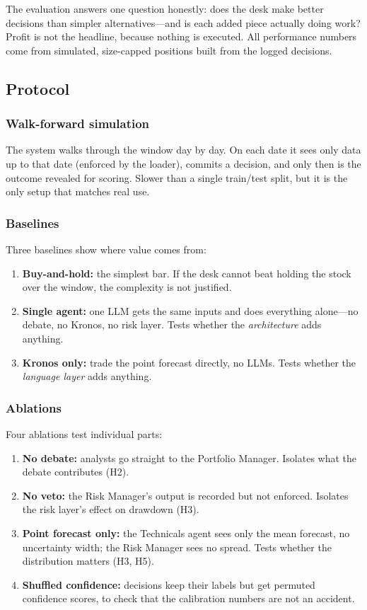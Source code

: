 \documentclass[conference]{IEEEtran}
\begin{document}
The evaluation answers one question honestly: does the desk make better decisions than simpler alternatives---and is each added piece actually doing work? Profit is not the headline, because nothing is executed. All performance numbers come from simulated, size-capped positions built from the logged decisions.

\subsection{Protocol}

\subsubsection{Walk-forward simulation} The system walks through the window day by day. On each date it sees only data up to that date (enforced by the loader), commits a decision, and only then is the outcome revealed for scoring. Slower than a single train/test split, but it is the only setup that matches real use.

\subsubsection{Baselines} Three baselines show where value comes from:
\begin{enumerate}[leftmargin=*,itemsep=1pt,topsep=2pt]
  \item \textbf{Buy-and-hold:} the simplest bar. If the desk cannot beat holding the stock over the window, the complexity is not justified.
  \item \textbf{Single agent:} one LLM gets the same inputs and does everything alone---no debate, no Kronos, no risk layer. Tests whether the \emph{architecture} adds anything.
  \item \textbf{Kronos only:} trade the point forecast directly, no LLMs. Tests whether the \emph{language layer} adds anything.
\end{enumerate}

\subsubsection{Ablations} Four ablations test individual parts:
\begin{enumerate}[leftmargin=*,itemsep=1pt,topsep=2pt]
  \item \textbf{No debate:} analysts go straight to the Portfolio Manager. Isolates what the debate contributes (H2).
  \item \textbf{No veto:} the Risk Manager's output is recorded but not enforced. Isolates the risk layer's effect on drawdown (H3).
  \item \textbf{Point forecast only:} the Technicals agent sees only the mean forecast, no uncertainty width; the Risk Manager sees no spread. Tests whether the distribution matters (H3, H5).
  \item \textbf{Shuffled confidence:} decisions keep their labels but get permuted confidence scores, to check that the calibration numbers are not an accident.
\end{enumerate}
\end{document}
